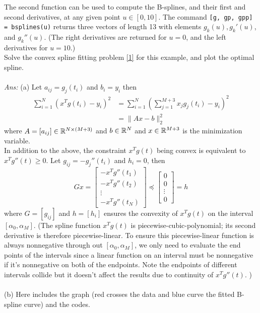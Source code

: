 \documentclass[12pt,a4paper]{article}
\renewcommand{\l}{\left}\renewcommand{\r}{\right}
\newcommand{\SUM}[2]{\sum\limits_{#1}^{#2}}
\newcommand{\x}{\times}
\def\R{\ifmmode\mathbb R\fi}
\begin{document}
The second function can be used to compute the B-splines, and their first and second derivatives, at any given point $u\in [0, 10]$. The command \texttt{[g, gp, gpp] = bsplines(u)} returns three vectors of length 13 with elements $g_k(u), g_k'(u)$, and $g_k''(u)$. (The right derivatives are returned for $u=0$, and the left derivatives for $u=10$.)\\
Solve the convex spline fitting problem \eqref{1} for this example, and plot the optimal spline. \\
\\
{\it Ans:} 
(a) Let $a_{ij} = g_j(t_i)$ and $b_i = y_i$ then
\begin{align*}
\SUM{i=1}N (x^T g(t_i) - y_i)^2 & = \SUM{i=1}N \l(\SUM{j=1}{M+3} x_jg_j(t_i) - y_i\r)^2\\
&= \|Ax-b\|_2^2
\end{align*}
where $A = [a_{ij}] \in \R^{N\x(M+3)}$ and $b\in\R^N$ and $x \in \R^{M+3}$ is the minimization variable. \\
In addition to the above, the constraint $x^Tg(t)$ being convex is equivalent to $x^Tg''(t) \geq 0$. Let $g_{ij} = -g_j''(t_i)$ and $h_i = 0$, then
$$Gx = \l[\begin{array}{c}
-x^Tg''(t_1)\\
-x^Tg''(t_2)\\
\vdots\\
-x^Tg''(t_N)\end{array}\r] \preceq \l[\begin{array}{c}
0\\
0\\
\vdots\\
0\end{array}\r]  = h$$
where $G = [g_{ij}]$ and $h = [h_i]$ ensures the convexity of $x^Tg(t)$ on the interval $[\alpha_0, \alpha_M]$. (The spline function $x^Tg(t)$ is piecewise-cubic-polynomial; its second derivative is therefore piecewise-linear. To ensure this piecewise-linear function is always nonnegative through out $[\alpha_0, \alpha_M]$, we only need to evaluate the end points of the intervals since a linear function on an interval must be nonnegative if it's nonnegative on both of the endpoints. Note the endpoints of different intervals collide but it doesn't affect the results due to continuity of $x^Tg''(t)$. ) \\
\\
(b) Here includes the graph (red crosses the data and blue curve the fitted B-spline curve) and the codes. 
\end{document}
